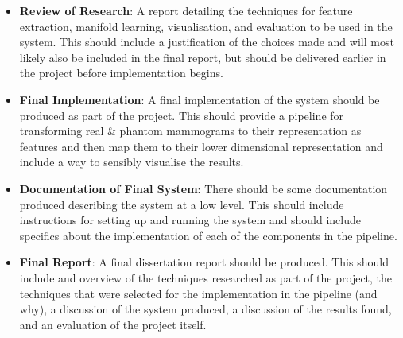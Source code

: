 \documentclass[11pt,fleqn,twoside]{article}
\begin{document}
\begin{itemize}
\item \textbf{Review of Research}: A report detailing the techniques for feature extraction, manifold learning, visualisation, and evaluation to be used in the system. This should include a justification of the choices made and will most likely also be included in the final report, but should be delivered earlier in the project before implementation begins.

\item \textbf{Final Implementation}: A final implementation of the system should be produced as part of the project. This should provide a pipeline for transforming real  \& phantom mammograms to their representation as features and then map them to their lower dimensional representation and include a way to sensibly visualise the results.

\item \textbf{Documentation of Final System}: There should be some documentation produced describing the system at a low level. This should include instructions for setting up and running the system and should include specifics about the implementation of each of the components in the pipeline.

\item \textbf{Final Report}: A final dissertation report should be produced. This should include and overview of the techniques researched as part of the project, the techniques that were selected for the implementation in the pipeline (and why), a discussion of the system produced, a discussion of the results found, and an evaluation of the project itself.

\end{itemize}

\nocite{*} %

\newpage
{} 

%
%

\renewcommand{\refname}{Annotated Bibliography}  %
\end{document}
